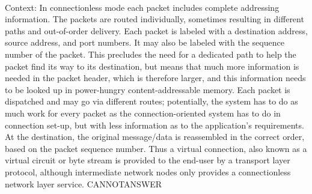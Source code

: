 \documentclass[11pt,a4paper, onecolumn]{article}
\begin{document}
\\ Context: In connectionless mode each packet includes complete addressing information. The packets are routed individually, sometimes resulting in different paths and out-of-order delivery. Each packet is labeled with a destination address, source address, and port numbers. It may also be labeled with the sequence number of the packet. This precludes the need for a dedicated path to help the packet find its way to its destination, but means that much more information is needed in the packet header, which is therefore larger, and this information needs to be looked up in power-hungry content-addressable memory. Each packet is dispatched and may go via different routes; potentially, the system has to do as much work for every packet as the connection-oriented system has to do in connection set-up, but with less information as to the application's requirements. At the destination, the original message/data is reassembled in the correct order, based on the packet sequence number. Thus a virtual connection, also known as a virtual circuit or byte stream is provided to the end-user by a transport layer protocol, although intermediate network nodes only provides a connectionless network layer service. CANNOTANSWER
\end{document}
